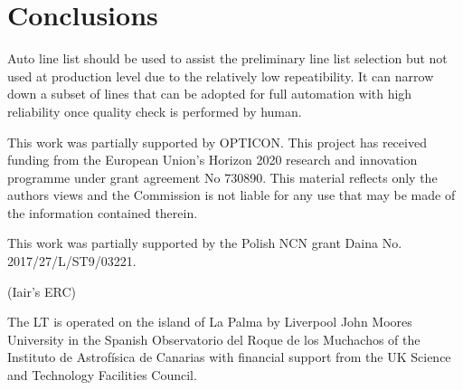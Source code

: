 \documentclass{aa}
\begin{document}
\section{Conclusions}
Auto line list should be used to assist the preliminary line list selection
but not used at production level due to the relatively low repeatibility.
It can narrow down a subset of lines that can be adopted for full
automation with high reliability once quality check is performed by human.


\begin{acknowledgements}
    This work was partially supported by OPTICON. This project has
    received funding from the European Union’s Horizon 2020 research and
    innovation programme under grant agreement No 730890. This material
    reflects only the authors views and the Commission is not liable for
    any use that may be made of the information contained therein.
    
    This work was partially supported by the Polish NCN grant Daina
    No. 2017/27/L/ST9/03221.
    
    (Iair's ERC)
    
    The LT is operated on the island of La Palma by Liverpool
    John Moores University in the Spanish Observatorio del Roque
    de los Muchachos of the Instituto de Astrof{\'i}sica de Canarias with
    financial support from the UK Science and Technology Facilities
    Council.
\end{acknowledgements}

%
%



\end{document}
